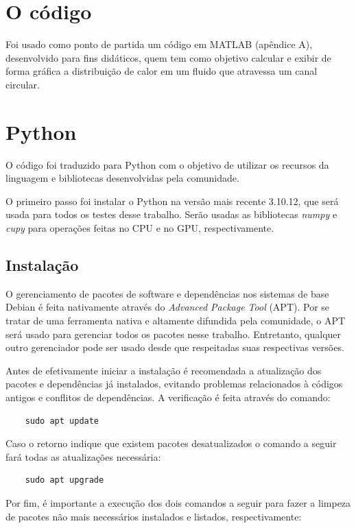 \documentclass[
    12pt,
    openright,
    oneside,
    a4paper,
    english,
    brazil,
]{abntex2}
\begin{document}
\section{O código}

Foi usado como ponto de partida um código em MATLAB (apêndice A), desenvolvido para fins didáticos, quem tem como objetivo calcular e exibir de forma gráfica a distribuição de calor em um fluido que atravessa um canal circular.

\section{Python}

O código foi traduzido para Python com o objetivo de utilizar os recursos da linguagem e bibliotecas desenvolvidas pela comunidade.

O primeiro passo foi instalar o Python na versão mais recente 3.10.12, que será usada para todos os testes desse trabalho. Serão usadas as bibliotecas \emph{numpy} e \emph{cupy} para operações feitas no CPU e no GPU, respectivamente.

\subsection{Instalação}

O gerenciamento de pacotes de software e dependências nos sistemas de base Debian é feita nativamente através do \emph{Advanced Package Tool} (APT). Por se tratar de uma ferramenta nativa e altamente difundida pela comunidade, o APT será usado para gerenciar todos os pacotes nesse trabalho. Entretanto, qualquer outro gerenciador pode ser usado desde que respeitadas suas respectivas versões.

Antes de efetivamente iniciar a instalação é recomendada a atualização dos pacotes e dependências já instalados, evitando problemas relacionados à códigos antigos e conflitos de dependências. A verificação é feita através do comando:

\begin{verbatim}
    sudo apt update
\end{verbatim}

Caso o retorno indique que existem pacotes desatualizados o comando a seguir fará todas as atualizações necessária:

\begin{verbatim}
    sudo apt upgrade
\end{verbatim}

Por fim, é importante a execução dos dois comandos a seguir para fazer a limpeza de pacotes não mais necessários instalados e listados, respectivamente:
\end{document}
